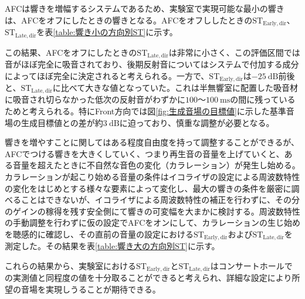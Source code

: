 \documentclass[11pt,a4j]{jreport}
\begin{document}
AFCは響きを増幅するシステムであるため、実験室で実現可能な最小の響きは、AFCをオフにしたときの響きとなる。AFCをオフししたときの$\mathrm{ST_{Early,dir}}$、$\mathrm{ST_{Late,dir}}$を表\ref{table:響き小の方向別ST}に示す。

この結果、AFCをオフにしたときの$\mathrm{ST_{Late,dir}}$は非常に小さく、この評価区間では音がほぼ完全に吸音されており、後期反射音についてはシステムで付加する成分によってほぼ完全に決定されると考えられる。一方で、$\mathrm{ST_{Early,dir}}$は$\SI{-25}{\dB}$前後と、$\mathrm{ST_{Late,dir}}$に比べて大きな値となっていた。これは半無響室に配置した吸音材に吸音され切らなかった低次の反射音がわずかに$100$〜$\SI{100}{\ms}$の間に残っているためと考えられる。特にFront方向では図\ref{fig:生成音場の目標値}に示した基準音場の生成目標値との差が約$\SI{3}{\dB}$に迫っており、慎重な調整が必要となる。

響きを増やすことに関してはある程度自由度を持って調整することができるが、AFCでつける響きを大きくしていく、つまり再生音の音量を上げていくと、ある音量を超えたときに不自然な音色の変化（カラレーション）が発生し始める。カラレーションが起こり始める音量の条件はイコライザの設定による周波数特性の変化をはじめとする様々な要素によって変化し、最大の響きの条件を厳密に調べることはできないが、イコライザによる周波数特性の補正を行わずに、その分のゲインの稼得を残す安全側にて響きの可変幅を大まかに検討する。周波数特性の手動調整を行わずに仮の設定でAFCをオンにして、カラレーションの生じ始めを聴感的に確認し、その直前の音量の設定における$\mathrm{ST_{Early,dir}}$および$\mathrm{ST_{Late,dir}}$を測定した。その結果を表\ref{table:響き大の方向別ST}に示す。

これらの結果から、実験室における$\mathrm{ST_{Early,dir}}$と$\mathrm{ST_{Late,dir}}$はコンサートホールでの実測値と同程度の値を十分取ることができると考えられ、詳細な設定により所望の音場を実現しうることが期待できる。
\end{document}
